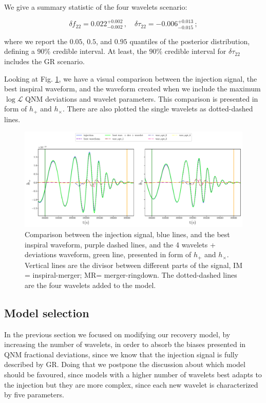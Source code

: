 We give a summary statistic of the four wavelets scenario: 

\begin{equation}
\delta f_{22} = 0.022^{+0.002}_{-0.002} \,, \quad 
\delta \tau_{22} = -0.006^{+0.013}_{-0.015} \,;
\end{equation}

\noindent 

where we report the $0.05$, $0.5$, and $0.95$ quantiles of the posterior distribution, defining a $90\%$ credible interval. At least, the $90\%$ credible interval for $\delta \tau_{22}$ includes the GR scenario.

Looking at Fig. \ref{fig:Inj_4wav}, we have a visual comparison between the injection signal, the best inspiral waveform, and the waveform created when we include the maximum $\log \mathcal{L}$ QNM deviations and wavelet parameters. This comparison is presented in form of $h_{+}$ and $h_{\times}$. There are also plotted the single wavelets as dotted-dashed lines.


\begin{figure}[h!]
    \centering
    \includegraphics[width=1\textwidth]{Images/Inj_4wav.pdf}
    \caption{Comparison between the injection signal, blue lines, and the best inspiral waveform, purple dashed lines, and the 4 wavelets + deviations waveform, green line, presented in form of $h_{+}$ and $h_{\times}$. Vertical lines are the divisor between different parts of the signal, IM = inspiral-merger; MR= merger-ringdown. The dotted-dashed lines are the four wavelets added to the model.}
    \label{fig:Inj_4wav}
\end{figure}
 
 
\subsection{Model selection}
In the previous section we focused on modifying our recovery model, by increasing the number of wavelets, in order to absorb the biases presented in QNM fractional deviations, since we know that the injection signal is fully described by GR. Doing that we postpone the discussion about which model should be favoured, since models with a higher number of wavelets best adapts to the injection but they are more complex, since each new wavelet is characterized by five parameters.

